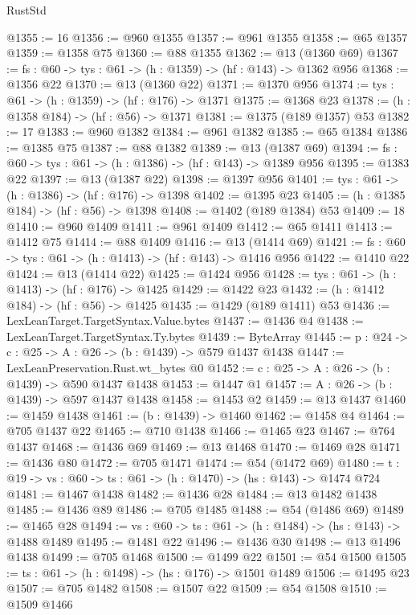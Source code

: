 \begin{lexlean}{RustStd}
\begin{coremodule}
@1355 := 16
@1356 := @960 @1355
@1357 := @961 @1355
@1358 := @65 @1357
@1359 := @1358 @75
@1360 := @88 @1355
@1362 := @13 (@1360 @69)
@1367 := {fs : @60} -> {tys : @61} -> (h : @1359) -> (hf : @143) -> @1362 @956
@1368 := @1356 @22
@1370 := @13 (@1360 @22)
@1371 := @1370 @956
@1374 := {tys : @61} -> (h : @1359) -> (hf : @176) -> @1371
@1375 := @1368 @23
@1378 := (h : @1358 @184) -> (hf : @56) -> @1371
@1381 := @1375 (@189 @1357) @53
@1382 := 17
@1383 := @960 @1382
@1384 := @961 @1382
@1385 := @65 @1384
@1386 := @1385 @75
@1387 := @88 @1382
@1389 := @13 (@1387 @69)
@1394 := {fs : @60} -> {tys : @61} -> (h : @1386) -> (hf : @143) -> @1389 @956
@1395 := @1383 @22
@1397 := @13 (@1387 @22)
@1398 := @1397 @956
@1401 := {tys : @61} -> (h : @1386) -> (hf : @176) -> @1398
@1402 := @1395 @23
@1405 := (h : @1385 @184) -> (hf : @56) -> @1398
@1408 := @1402 (@189 @1384) @53
@1409 := 18
@1410 := @960 @1409
@1411 := @961 @1409
@1412 := @65 @1411
@1413 := @1412 @75
@1414 := @88 @1409
@1416 := @13 (@1414 @69)
@1421 := {fs : @60} -> {tys : @61} -> (h : @1413) -> (hf : @143) -> @1416 @956
@1422 := @1410 @22
@1424 := @13 (@1414 @22)
@1425 := @1424 @956
@1428 := {tys : @61} -> (h : @1413) -> (hf : @176) -> @1425
@1429 := @1422 @23
@1432 := (h : @1412 @184) -> (hf : @56) -> @1425
@1435 := @1429 (@189 @1411) @53
@1436 := LexLeanTarget.TargetSyntax.Value.bytes
@1437 := @1436 @4
@1438 := LexLeanTarget.TargetSyntax.Ty.bytes
@1439 := ByteArray
@1445 := {p : @24} -> {c : @25} -> {A : @26} -> (b : @1439) -> @579 @1437 @1438
@1447 := LexLeanPreservation.Rust.wt_bytes @0
@1452 := {c : @25} -> {A : @26} -> (b : @1439) -> @590 @1437 @1438
@1453 := @1447 @1
@1457 := {A : @26} -> (b : @1439) -> @597 @1437 @1438
@1458 := @1453 @2
@1459 := @13 @1437
@1460 := @1459 @1438
@1461 := (b : @1439) -> @1460
@1462 := @1458 @4
@1464 := @705 @1437 @22
@1465 := @710 @1438
@1466 := @1465 @23
@1467 := @764 @1437
@1468 := @1436 @69
@1469 := @13 @1468
@1470 := @1469 @28
@1471 := @1436 @80
@1472 := @705 @1471
@1474 := @54 (@1472 @69)
@1480 := {t : @19} -> {vs : @60} -> {ts : @61} -> (h : @1470) -> (hs : @143) -> @1474 @724
@1481 := @1467 @1438
@1482 := @1436 @28
@1484 := @13 @1482 @1438
@1485 := @1436 @89
@1486 := @705 @1485
@1488 := @54 (@1486 @69)
@1489 := @1465 @28
@1494 := {vs : @60} -> {ts : @61} -> (h : @1484) -> (hs : @143) -> @1488 @1489
@1495 := @1481 @22
@1496 := @1436 @30
@1498 := @13 @1496 @1438
@1499 := @705 @1468
@1500 := @1499 @22
@1501 := @54 @1500
@1505 := {ts : @61} -> (h : @1498) -> (hs : @176) -> @1501 @1489
@1506 := @1495 @23
@1507 := @705 @1482
@1508 := @1507 @22
@1509 := @54 @1508
@1510 := @1509 @1466

\end{coremodule}
\end{lexlean}
